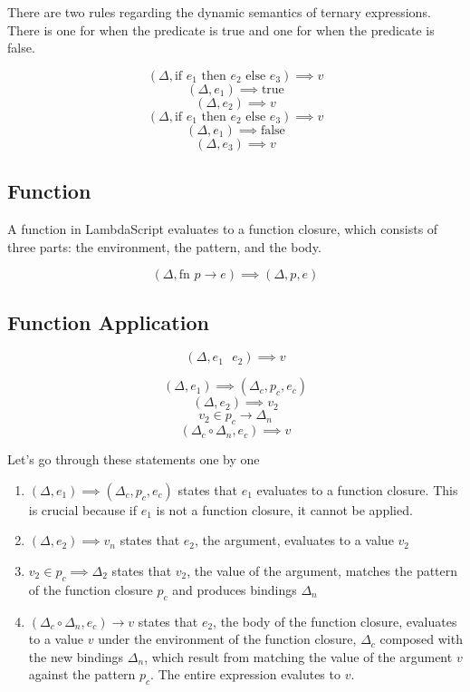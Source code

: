 \documentclass[titlepage]{article}
\begin{document}
There are two rules regarding the dynamic semantics of ternary expressions. There is one for when the predicate is true and one for when the predicate is false.


$$(\Delta, \text{if } e_1 \text{ then } e_2 \text{ else } e_3) \implies v$$
\noindent\makebox[\linewidth]{\rule{2.2in}{0.4pt}}
$$(\Delta, e_1) \implies \text{true}$$
$$(\Delta, e_2) \implies v$$
\noindent\makebox[\linewidth]{\rule{3in}{0.4pt}}
$$(\Delta, \text{if } e_1 \text{ then } e_2 \text{ else } e_3) \implies v$$
\noindent\makebox[\linewidth]{\rule{2.2in}{0.4pt}}
$$(\Delta, e_1) \implies \text{false}$$
$$(\Delta, e_3) \implies v$$

\subsection{Function}

A function in LambdaScript evaluates to a function closure, which consists of three parts: the environment, the pattern, and the body.

$$(\Delta, \text{fn } p \rightarrow e) \implies (\Delta, p, e)$$

\subsection{Function Application}

$$(\Delta, e_1 \text{ } e_2) \implies v$$
\noindent\makebox[\linewidth]{\rule{1.2in}{0.4pt}}

$$(\Delta, e_1) \implies (\Delta_c, p_c, e_c)$$
$$(\Delta, e_2) \implies v_2$$
$$v_2 \in p_c \rightarrow \Delta_n$$
$$(\Delta_c \circ \Delta_n, e_c) \implies v$$

Let's go through these statements one by one

\begin{enumerate}
\item $(\Delta, e_1) \implies (\Delta_c, p_c, e_c)$ states that $e_1$ evaluates to a function closure. This is crucial because if $e_1$ is not a function closure, it cannot be applied.
\item $(\Delta, e_2) \implies v_n$ states that $e_2$, the argument, evaluates to a value $v_2$
\item $v_2 \in p_c \implies \Delta_2$ states that $v_2$, the value of the argument, matches the pattern of the function closure $p_c$ and produces bindings $\Delta_n$
\item $(\Delta_c \circ \Delta_n, e_c) \rightarrow v$ states that $e_2$, the body of the function closure, evaluates to a value $v$ under the environment of the function closure, $\Delta_c$ composed with the new bindings $\Delta_n$, which result from matching the value of the argument $v$ against the pattern $p_c$. The entire expression evalutes to $v$.

\end{enumerate}
\end{document}
